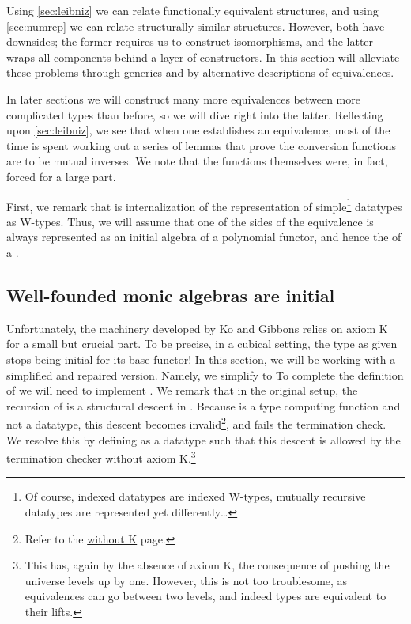 Using \autoref{sec:leibniz} we can relate functionally equivalent structures, and using \autoref{sec:numrep} we can relate structurally similar structures. However, both have downsides; the former requires us to construct isomorphisms, and the latter wraps all components behind a layer of constructors.  In this section will alleviate these problems through generics and by alternative descriptions of equivalences.

In later sections we will construct many more equivalences between more complicated types than before, so we will dive right into the latter. Reflecting upon \autoref{sec:leibniz}, we see that when one establishes an equivalence, most of the time is spent working out a series of lemmas that prove the conversion functions are to be mutual inverses. We note that the functions themselves were, in fact, forced for a large part.  %

First, we remark that  is internalization of the representation of simple\footnote{Of course, indexed datatypes are indexed W-types, mutually recursive datatypes are represented yet differently\dots} datatypes as W-types. Thus, we will assume that one of the sides of the equivalence is always represented as an initial algebra of a polynomial functor, and hence the  of a .

\subsection{Well-founded monic algebras are initial}\label{ssec:wellfounded}
Unfortunately, the machinery developed by Ko and Gibbons \cite{progorn} relies on axiom K for a small but crucial part. To be precise, in a cubical setting, the type  as given stops being initial for its base functor! In this section, we will be working with a simplified and repaired version. Namely, we simplify  to 
To complete the definition of 
we will need to implement . We remark that in the original setup, the recursion of  is a structural descent in . Because  is a type computing function and not a datatype, this descent becomes invalid\footnote{Refer to the  \href{https://agda.readthedocs.io/en/latest/language/without-k.html\#restrictions-on-termination-checking}{without K} page.}, and  fails the termination check. We resolve this by defining  as a datatype
such that this descent is allowed by the termination checker without axiom K.\footnote{This has, again by the absence of axiom K, the consequence of pushing the universe levels up by one. However, this is not too troublesome, as equivalences can go between two levels, and indeed types are equivalent to their lifts.}

